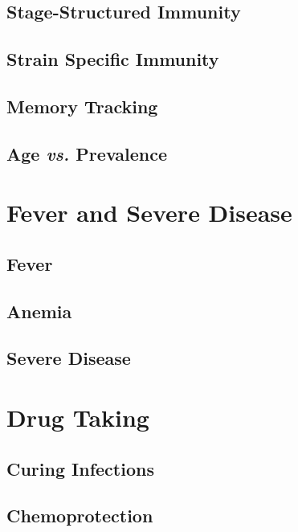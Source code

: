 \documentclass[
]{book}
\begin{document}
\section{Stage-Structured Immunity}\label{stage-structured-immunity}

\section{Strain Specific Immunity}\label{strain-specific-immunity}

\section{Memory Tracking}\label{memory-tracking}

\section{\texorpdfstring{Age \emph{vs.} Prevalence}{Age vs. Prevalence}}\label{age-vs.-prevalence}

\chapter{Fever and Severe Disease}\label{fever-and-severe-disease}

\section{Fever}\label{fever}

\section{Anemia}\label{anemia}

\section{Severe Disease}\label{severe-disease}

\chapter{Drug Taking}\label{drug-taking}

\section{Curing Infections}\label{curing-infections}

\section{Chemoprotection}\label{chemoprotection}
\end{document}
